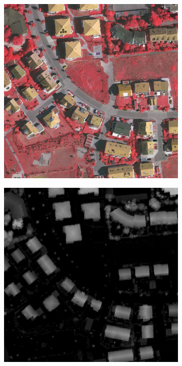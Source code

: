 \begin{figure}[htb]
\begin{subfigure}{0.19\textwidth}
  \centering
  \includegraphics[width=1\linewidth]{fig/vai/37_irg.JPG}
  \caption{}
\end{subfigure}\vspace{1mm}
\begin{subfigure}{0.19\textwidth}
  \centering
  \includegraphics[width=1\linewidth]{fig/vai/37_hm.jpg}

\end{subfigure}
\end{figure}
